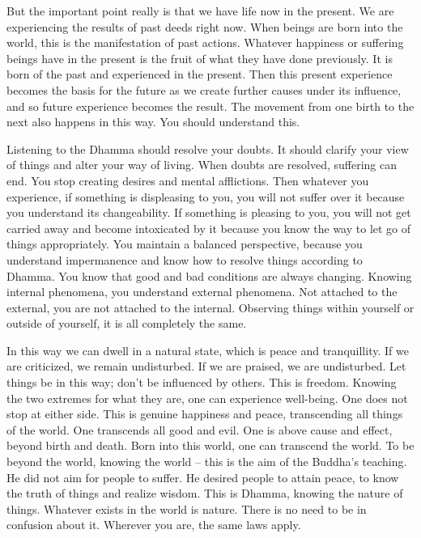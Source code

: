 But the important point really is that we have life now in the present. We are experiencing the results of past deeds right now. When beings are born into the world, this is the manifestation of past actions. Whatever happiness or suffering beings have in the present is the fruit of what they have done previously. It is born of the past and experienced in the present. Then this present experience becomes the basis for the future as we create further causes under its influence, and so future experience becomes the result. The movement from one birth to the next also happens in this way. You should understand this. 

Listening to the Dhamma should resolve your doubts. It should clarify your view of things and alter your way of living. When doubts are resolved, suffering can end. You stop creating desires and mental afflictions. Then whatever you experience, if something is displeasing to you, you will not suffer over it because you understand its changeability. If something is pleasing to you, you will not get carried away and become intoxicated by it because you know the way to let go of things appropriately. You maintain a balanced perspective, because you understand impermanence and know how to resolve things according to Dhamma. You know that good and bad conditions are always changing. Knowing internal phenomena, you understand external phenomena. Not attached to the external, you are not attached to the internal. Observing things within yourself or outside of yourself, it is all completely the same. 

In this way we can dwell in a natural state, which is peace and tranquillity. If we are criticized, we remain undisturbed. If we are praised, we are undisturbed. Let things be in this way; don't be influenced by others. This is freedom. Knowing the two extremes for what they are, one can experience well-being. One does not stop at either side. This is genuine happiness and peace, transcending all things of the world. One transcends all good and evil. One is above cause and effect, beyond birth and death. Born into this world, one can transcend the world. To be beyond the world, knowing the world -- this is the aim of the Buddha's teaching. He did not aim for people to suffer. He desired people to attain peace, to know the truth of things and realize wisdom. This is Dhamma, knowing the nature of things. Whatever exists in the world is nature. There is no need to be in confusion about it. Wherever you are, the same laws apply. 

